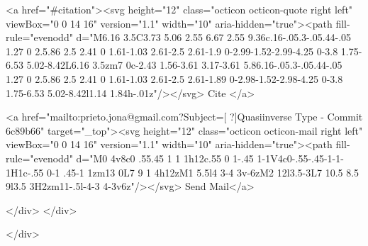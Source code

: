       <a  href="#citation"><svg height="12" class="octicon octicon-quote right left" viewBox="0 0 14 16" version="1.1" width="10" aria-hidden="true"><path fill-rule="evenodd" d="M6.16 3.5C3.73 5.06 2.55 6.67 2.55 9.36c.16-.05.3-.05.44-.05 1.27 0 2.5.86 2.5 2.41 0 1.61-1.03 2.61-2.5 2.61-1.9 0-2.99-1.52-2.99-4.25 0-3.8 1.75-6.53 5.02-8.42L6.16 3.5zm7 0c-2.43 1.56-3.61 3.17-3.61 5.86.16-.05.3-.05.44-.05 1.27 0 2.5.86 2.5 2.41 0 1.61-1.03 2.61-2.5 2.61-1.89 0-2.98-1.52-2.98-4.25 0-3.8 1.75-6.53 5.02-8.42l1.14 1.84h-.01z"/></svg> Cite
      </a>

      <a href="mailto:prieto.jona@gmail.com?Subject=[ ?]Quasiinverse Type - Commit 6c89b66" target="_top"><svg height="12" class="octicon octicon-mail right left" viewBox="0 0 14 16" version="1.1" width="10" aria-hidden="true"><path fill-rule="evenodd" d="M0 4v8c0 .55.45 1 1 1h12c.55 0 1-.45 1-1V4c0-.55-.45-1-1-1H1c-.55 0-1 .45-1 1zm13 0L7 9 1 4h12zM1 5.5l4 3-4 3v-6zM2 12l3.5-3L7 10.5 8.5 9l3.5 3H2zm11-.5l-4-3 4-3v6z"/></svg> Send Mail</a>

    </div>
  </div>

</div>




